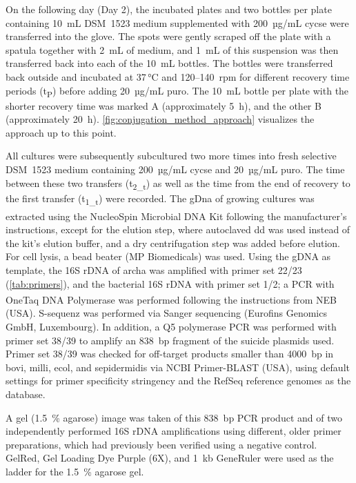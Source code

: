 On the following day (Day 2), the incubated plates and two bottles per plate containing 10~mL DSM~1523 medium supplemented with 200~µg/mL \acrlong{cycse} were transferred into the \gls{glove}. The spots were gently scraped off the plate with a spatula together with 2~mL of medium, and 1~mL of this suspension was then transferred back into each of the 10~mL bottles. The bottles were transferred back outside and incubated at 37\,°C and 120--140~rpm for different recovery time periods (t\textsubscript{P}) before adding 20~µg/mL \acrshort{puro}. The 10~mL bottle per plate with the shorter recovery time was marked A (approximately 5~h), and the other B (approximately 20~h). \cref{fig:conjugation_method_approach} visualizes the approach up to this point.

All cultures were subsequently subcultured two more times into fresh selective DSM~1523 medium containing 200~µg/mL \acrlong{cycse} and 20~µg/mL \acrshort{puro}. The time between these two transfers (t\textsubscript{2\_t}) as well as the time from the end of recovery to the first transfer (t\textsubscript{1\_t}) were recorded. The \acrshort{gDna} of growing cultures was extracted using the NucleoSpin\textsuperscript{\textregistered} Microbial DNA Kit following the manufacturer's instructions, except for the elution step, where autoclaved dd was used instead of the kit's elution buffer, and a dry centrifugation step was added before elution. For cell lysis, a bead beater (MP Biomedicals) was used. Using the gDNA as template, the 16S rDNA of \gls{archa} was amplified with primer set 22/23 (\cref{tab:primers}), and the bacterial 16S rDNA with primer set 1/2; a PCR with OneTaq\textsuperscript{\textregistered} DNA Polymerase was performed following the instructions from NEB (USA). \gls{S-sequenz} was performed via Sanger sequencing (Eurofins Genomics GmbH, Luxembourg). In addition, a Q5 polymerase PCR was performed with primer set 38/39 to amplify an 838~bp fragment of the suicide plasmids used. Primer set 38/39 was checked for off-target products smaller than 4000~bp in \acrshort{bovi}, \acrshort{milli}, \acrshort{ecol}, and \acrlong{sepidermidis} via NCBI Primer-BLAST (USA), using default settings for primer specificity stringency and the RefSeq reference genomes as the database.\clearpage

A gel (1.5~\% agarose) image was taken of this 838~bp PCR product and of two independently performed 16S rDNA amplifications using different, older primer preparations, which had previously been verified using a negative control. GelRed, Gel Loading Dye Purple (6X), and 1~kb GeneRuler were used as the ladder for the 1.5~\% agarose gel.

